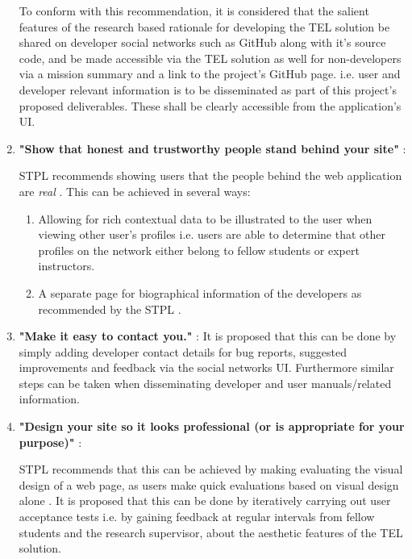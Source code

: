 \begin{enumerate}
    To conform with this recommendation, it is considered that the salient features of the research based rationale for developing the TEL solution be shared on developer social networks such as GitHub along with it's source code, and be made accessible via the TEL solution as well for non-developers via a mission summary and a link to the project's GitHub page. i.e. user and developer relevant information is to be disseminated as part of this project's proposed deliverables. These shall be clearly accessible from the application's UI.
    
    \item \textbf{"Show that honest and trustworthy people stand behind your site"} \cite{Fogg2002a}:
    
    STPL recommends showing users that the people behind the web application are \textit{real} \cite{Fogg2002a}. This can be achieved in several ways:
    \begin{enumerate}
        \item Allowing for rich contextual data to be illustrated to the user when viewing other user's profiles i.e. users are able to determine that other profiles on the network either belong to fellow students or expert instructors.
        \item A separate page for biographical information of the developers as recommended by the STPL \cite{Fogg2002a}.
    \end{enumerate}
    
    \item \textbf{"Make it easy to contact you."} \cite{Fogg2002a}:
    It is proposed that this can be done by simply adding developer contact details for bug reports, suggested improvements and feedback via the social networks UI. Furthermore similar steps can be taken when disseminating developer and user manuals/related information.

    \item \textbf{"Design your site so it looks professional (or is appropriate for your purpose)"} \cite{Fogg2002a}:
    
    STPL recommends that this can be achieved by making evaluating the visual design of a web page, as users make quick evaluations based on visual design alone \cite{Fogg2002a}. It is proposed that this can be done by iteratively carrying out user acceptance tests i.e. by gaining feedback at regular intervals from fellow students and the research supervisor, about the aesthetic features of the TEL solution.


\end{enumerate}
